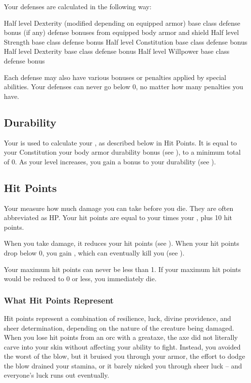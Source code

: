     Your defenses are calculated in the following way:
    \begin{raggeditemize}
       Half level \add Dexterity (modified depending on equipped armor) \add base class defense bonus (if any) \add defense bonuses from equipped body armor and shield
       Half level \add Strength \add base class defense bonus
       Half level \add Constitution \add base class defense bonus
       Half level \add Dexterity \add base class defense bonus
       Half level \add Willpower \add base class defense bonus
    \end{raggeditemize}
    Each defense may also have various bonuses or penalties applied by special abilities.
    Your defenses can never go below 0, no matter how many penalties you have.

  \subsection{Durability}\label{Durability}
    Your  is used to calculate your , as described below in Hit Points.
    It is equal to your Constitution \add your body armor durability bonus (see ), to a minimum total of 0.
    As your level increases, you gain a bonus to your durability (see ).

  \subsection{Hit Points}\label{Hit Points}
    Your  measure how much damage you can take before you die.
    They are often abbreviated as HP.
    Your hit points are equal to your  times your , plus 10 hit points.

    When you take damage, it reduces your hit points (see ).
    When your hit points drop below 0, you gain , which can eventually kill you (see ).

    Your maximum hit points can never be less than 1.
    If your maximum hit points would be reduced to 0 or less, you immediately die.

    \subsubsection{What Hit Points Represent}
    Hit points represent a combination of resilience, luck, divine providence, and sheer determination, depending on the nature of the creature being damaged.
    When you lose hit points from an orc with a greataxe, the axe did not literally carve into your skin without affecting your ability to fight.
    Instead, you avoided the worst of the blow, but it bruised you through your armor, the effort to dodge the blow drained your stamina, or it barely nicked you through sheer luck -- and everyone's luck runs out eventually.

